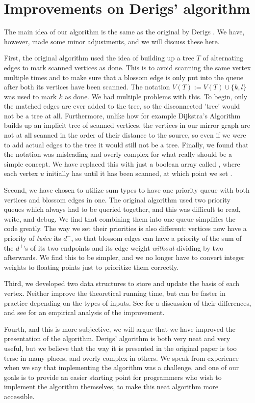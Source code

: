 \section{Improvements on Derigs' algorithm}
The main idea of our algorithm is the same as the original by Derigs \cite{source:derigs_shortest_odd_path}. We have, however, made some minor adjustments, and we will discuss these here.

First, the original algorithm used the idea of building up a tree $T$ of alternating edges to mark scanned vertices as done. This is to avoid scanning the same vertex multiple times and to make sure that a blossom edge is only put into the queue after both its vertices have been scanned. The notation $V(T) := V(T) \cup \{k,l\}$ was used to mark $k$ as done. We had multiple problems with this. To begin, only the matched edges are ever added to the tree, so the disconnected 'tree' would not be a tree at all. Furthermore, unlike how for example Dijkstra's Algorithm builds up an implicit tree of scanned vertices, the vertices in our mirror graph are not at all scanned in the order of their distance to the source, so even if we were to add actual edges to the tree it would still not be a tree. Finally, we found that the notation was misleading and overly complex for what really should be a simple concept. We have replaced this with just a boolean array called , where each vertex $u$ initially has  until it has been scanned, at which point we set .

Second, we have chosen to utilize sum types to have one priority queue with both vertices and blossom edges in one. The original algorithm used two priority queues which always had to be queried together, and this was difficult to read, write, and debug. We find that combining them into one queue simplifies the code greatly. The way we set their priorities is also different: vertices now have a priority of \emph{twice} its $d^-$, so that blossom edges can have a priority of the sum of the $d^+$'s of its two endpoints and its edge weight \emph{without} dividing by two afterwards. We find this to be simpler, and we no longer have to convert integer weights to floating points just to prioritize them correctly.

Third, we developed two data structures to store and update the basis of each vertex. Neither improve the theoretical running time, but can be faster in practice depending on the types of inputs. See  for a discussion of their differences, and see  for an empirical analysis of the improvement.
 
Fourth, and this is more subjective, we will argue that we have improved the presentation of the algorithm. Derigs' algorithm is both very neat and very useful, but we believe that the way it is presented in the original paper \cite{source:derigs_shortest_odd_path} is too terse in many places, and overly complex in others. We speak from experience when we say that implementing the algorithm was a challenge, and one of our goals is to provide an easier starting point for programmers who wish to implement the algorithm themselves, to make this neat algorithm more accessible.
